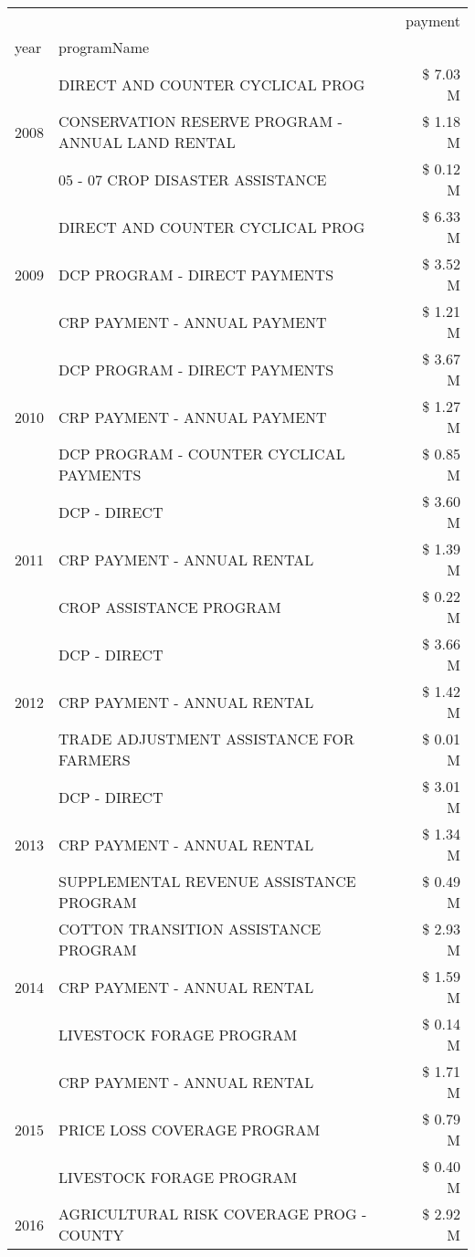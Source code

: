 \begin{tabular}{llr}
\toprule
 &  & payment \\
year & programName &  \\
\midrule
\multirow[t]{3}{*}{2008} & DIRECT AND COUNTER CYCLICAL PROG & \$ 7.03 M \\
 & CONSERVATION RESERVE PROGRAM - ANNUAL LAND RENTAL & \$ 1.18 M \\
 & 05 - 07 CROP DISASTER ASSISTANCE & \$ 0.12 M \\
\cline{1-3}
\multirow[t]{3}{*}{2009} & DIRECT AND COUNTER CYCLICAL PROG & \$ 6.33 M \\
 & DCP PROGRAM - DIRECT PAYMENTS & \$ 3.52 M \\
 & CRP PAYMENT - ANNUAL PAYMENT & \$ 1.21 M \\
\cline{1-3}
\multirow[t]{3}{*}{2010} & DCP PROGRAM - DIRECT PAYMENTS & \$ 3.67 M \\
 & CRP PAYMENT - ANNUAL PAYMENT & \$ 1.27 M \\
 & DCP PROGRAM - COUNTER CYCLICAL PAYMENTS & \$ 0.85 M \\
\cline{1-3}
\multirow[t]{3}{*}{2011} & DCP - DIRECT & \$ 3.60 M \\
 & CRP PAYMENT - ANNUAL RENTAL & \$ 1.39 M \\
 & CROP ASSISTANCE PROGRAM & \$ 0.22 M \\
\cline{1-3}
\multirow[t]{3}{*}{2012} & DCP - DIRECT & \$ 3.66 M \\
 & CRP PAYMENT - ANNUAL RENTAL & \$ 1.42 M \\
 & TRADE ADJUSTMENT ASSISTANCE FOR FARMERS & \$ 0.01 M \\
\cline{1-3}
\multirow[t]{3}{*}{2013} & DCP - DIRECT & \$ 3.01 M \\
 & CRP PAYMENT - ANNUAL RENTAL & \$ 1.34 M \\
 & SUPPLEMENTAL REVENUE ASSISTANCE PROGRAM & \$ 0.49 M \\
\cline{1-3}
\multirow[t]{3}{*}{2014} & COTTON TRANSITION ASSISTANCE PROGRAM & \$ 2.93 M \\
 & CRP PAYMENT - ANNUAL RENTAL & \$ 1.59 M \\
 & LIVESTOCK FORAGE PROGRAM & \$ 0.14 M \\
\cline{1-3}
\multirow[t]{3}{*}{2015} & CRP PAYMENT - ANNUAL RENTAL & \$ 1.71 M \\
 & PRICE LOSS COVERAGE PROGRAM & \$ 0.79 M \\
 & LIVESTOCK FORAGE PROGRAM & \$ 0.40 M \\
\cline{1-3}
\multirow[t]{3}{*}{2016} & AGRICULTURAL RISK COVERAGE PROG - COUNTY & \$ 2.92 M \\

\end{tabular}
